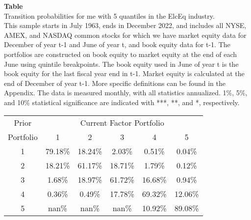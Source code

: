 \begin{table*}[ht!]
\raggedright
{}
\label{tab: transition_probs_me_ElcEq_with_5_quantiles}
\textbf{Table \thetable} \\
Transition probabilities for me with 5 quantiles in the ElcEq industry. \\
\hspace*{1em}This sample starts in July 1963, ends in December 2022, and includes all NYSE, AMEX, and NASDAQ common stocks for which we have market equity data for December of year t-1 and June of year t, and book equity data for t-1. The portfolios are constructed on book equity to market equity at the end of each June using quintile breakpoints.  The book equity used in June of year t is the book equity for the last fiscal year end in t-1.  Market equity is calculated at the end of December of year t-1.  More specific definitions can be found in the Appendix.  The data is measured monthly, with all statistics annualized.  1\%, 5\%, and 10\% statistical significance are indicated with ***, **, and *, respectively. \\
\vspace{0.5em}
\centering
\begin{adjustbox}{max width=\textwidth}
\begin{tabular}{@{}cccccc@{}}
\toprule
Prior & \multicolumn{5}{c}{Current Factor Portfolio} \\
Portfolio & 1 & 2 & 3 & 4 & 5 \\
\midrule
1 & 79.18\% & 18.24\% & 2.03\% & 0.51\% & 0.04\% \\
2 & 18.21\% & 61.17\% & 18.71\% & 1.79\% & 0.12\% \\
3 & 1.68\% & 18.97\% & 61.72\% & 16.68\% & 0.94\% \\
4 & 0.36\% & 0.49\% & 17.78\% & 69.32\% & 12.06\% \\
5 & nan\% & nan\% & nan\% & 10.92\% & 89.08\% \\
\bottomrule
\end{tabular}
\end{adjustbox}
\end{table*}
